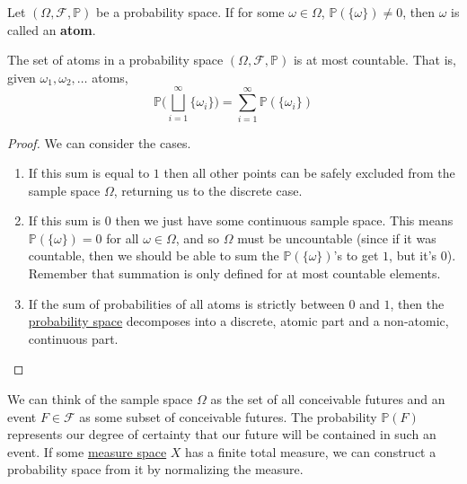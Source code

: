   \begin{definition}[Atom]
    \label{def:atom}
    Let $(\Omega, \mathcal{F}, \mathbb{P})$ be a probability space. If for some $\omega \in \Omega$, $\mathbb{P}(\{\omega\}) \neq 0$, then $\omega$ is called an \textbf{atom}. 
  \end{definition}

	\begin{lemma}
		\label{thm:countable-atoms}
	  The set of atoms in a probability space $(\Omega, \mathcal{F}, \mathbb{P})$ is at most countable. That is, given $\omega_1, \omega_2, \ldots$ atoms, 
		\begin{equation}
			\mathbb{P} \bigg( \bigsqcup_{i=1}^\infty \{\omega_i\} \bigg) = \sum_{i=1}^\infty \mathbb{P}(\{\omega_i\})
		\end{equation}
	\end{lemma}
	\begin{proof}
		We can consider the cases. 
		\begin{enumerate}
			\item If this sum is equal to $1$ then all other points can be safely excluded from the sample space $\Omega$, returning us to the discrete case. 
			\item If this sum is $0$ then we just have some continuous sample space. This means $\mathbb{P}(\{\omega\}) = 0$ for all $\omega \in \Omega$, and so $\Omega$ must be uncountable (since if it was countable, then we should be able to sum the $\mathbb{P}(\{\omega\})$'s to get $1$, but it's $0$). Remember that summation is only defined for at most countable elements. 
			\item If the sum of probabilities of all atoms is strictly between $0$ and $1$, then the \hyperref[def:probability-space]{probability space} decomposes into a discrete, atomic part and a non-atomic, continuous part. 
		\end{enumerate}
	\end{proof}

  We can think of the sample space $\Omega$ as the set of all conceivable futures and an event $F \in \mathcal{F}$ as some subset of conceivable futures. The probability $\mathbb{P}(F)$ represents our degree of certainty that our future will be contained in such an event. If some \hyperref[mt-def:measure-space]{measure space} $X$ has a finite total measure, we can construct a probability space from it by normalizing the measure. 

